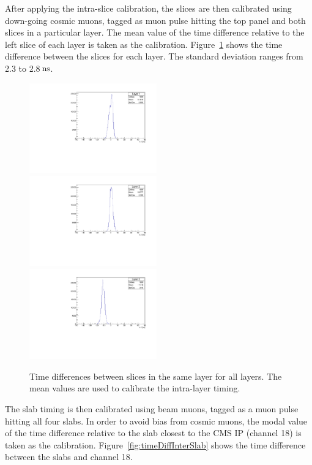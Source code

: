 \documentclass[12pt]{article}
\newcommand{\unit}[1]{\ensuremath{\text{\,#1}}\xspace}
\begin{document}
After applying the intra-slice calibration, the slices are then calibrated using down-going cosmic muons, tagged as muon pulse hitting the top panel and both slices in a particular layer.
The mean value of the time difference relative to the left slice of each layer is taken as the calibration.
Figure~\ref{fig:timeDiffIntraLayer} shows the time difference between the slices for each layer.
The standard deviation ranges from 2.3 to 2.8\unit{ns}.

\begin{figure}
    \centering
    \includegraphics[width=0.49\textwidth]{figures/timingPlots/intraLayer/Layer_1.pdf}~
    \includegraphics[width=0.49\textwidth]{figures/timingPlots/intraLayer/Layer_2.pdf}\\
    \includegraphics[width=0.49\textwidth]{figures/timingPlots/intraLayer/Layer_3.pdf}
    \caption{\label{fig:timeDiffIntraLayer} Time differences between slices in the same layer for all layers. The mean values are used to calibrate the intra-layer timing.}
\end{figure}

The slab timing is then calibrated using beam muons, tagged as a muon pulse 
hitting all four slabs. In order to avoid bias from cosmic muons, the modal 
value of the time difference relative to the slab closest to the CMS IP (channel 18) 
is taken as the calibration. Figure~\ref{fig:timeDiffInterSlab} shows
the time difference between the slabs and channel 18. 
\end{document}
